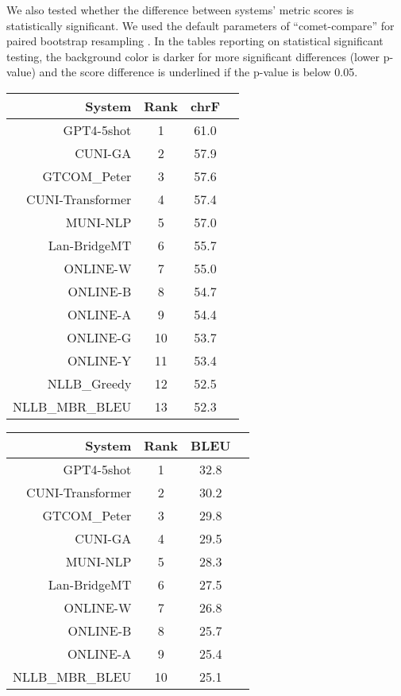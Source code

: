 \documentclass[11pt]{article}
\begin{document}
We also tested whether the difference between systems' metric scores is statistically significant. We used the default parameters of ``comet-compare'' for paired bootstrap resampling \citep{koehn-2004-statistical}. In the tables reporting on statistical significant testing, the background color is darker for more significant differences (lower p-value) and the score difference is underlined if the p-value is below 0.05.
\clearpage
\begin{table}[]  
\scriptsize\begin{subtable}[t]{0.33\textwidth}
\begin{tabular}{rccc}
\toprule 
System & Rank & chrF \\ 
\midrule 
GPT4-5shot & 1 & 61.0 \\ 
CUNI-GA & 2 & 57.9 \\ 
GTCOM\_Peter & 3 & 57.6 \\ 
CUNI-Transformer & 4 & 57.4 \\ 
MUNI-NLP & 5 & 57.0 \\ 
Lan-BridgeMT & 6 & 55.7 \\ 
ONLINE-W & 7 & 55.0 \\ 
ONLINE-B & 8 & 54.7 \\ 
ONLINE-A & 9 & 54.4 \\ 
ONLINE-G & 10 & 53.7 \\ 
ONLINE-Y & 11 & 53.4 \\ 
NLLB\_Greedy & 12 & 52.5 \\ 
NLLB\_MBR\_BLEU & 13 & 52.3 \\ 
\bottomrule 
\end{tabular} 
\end{subtable} 
\begin{subtable}[t]{0.33\textwidth}
\begin{tabular}{rccc}
\toprule 
System & Rank & BLEU \\ 
\midrule 
GPT4-5shot & 1 & 32.8 \\ 
CUNI-Transformer & 2 & 30.2 \\ 
GTCOM\_Peter & 3 & 29.8 \\ 
CUNI-GA & 4 & 29.5 \\ 
MUNI-NLP & 5 & 28.3 \\ 
Lan-BridgeMT & 6 & 27.5 \\ 
ONLINE-W & 7 & 26.8 \\ 
ONLINE-B & 8 & 25.7 \\ 
ONLINE-A & 9 & 25.4 \\ 
NLLB\_MBR\_BLEU & 10 & 25.1 \\ 

\end{tabular}
\end{subtable}
\end{table}
\end{document}
